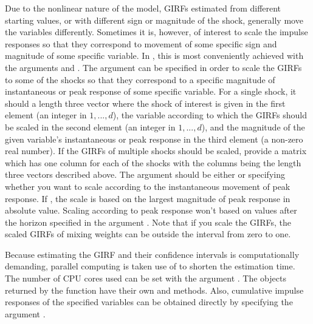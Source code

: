 \documentclass[nojss]{jss} %
\begin{document}
Due to the nonlinear nature of the model, GIRFs estimated from different starting values, or with different sign or magnitude of the shock, generally move the variables differently. Sometimes it is, however, of interest to scale the impulse responses so that they correspond to movement of some specific sign and magnitude of some specific variable. In , this is most conveniently achieved with the arguments  and . The argument  can be specified in order to scale the GIRFs to some of the shocks so that they correspond to a specific magnitude of instantaneous or peak response of some specific variable. For a single shock, it should a length three vector where the shock of interest is given in the first element (an integer in $1,...,d$), the variable according to which the GIRFs should be scaled in the second element (an integer in $1,...,d$), and the magnitude of the given variable's instantaneous or peak response in the third element (a non-zero real number). If the GIRFs of multiple shocks should be scaled, provide a matrix which has one column for each of the shocks with the columns being the length three vectors described above. The argument  should be either  or  specifying whether you want to scale according to the instantaneous movement of peak response. If , the scale is based on the largest magnitude of peak response in absolute value. Scaling according to peak response won't based on values after the horizon specified in the argument . Note that if you scale the GIRFs, the scaled GIRFs of mixing weights can be outside the interval from zero to one.

Because estimating the GIRF and their confidence intervals is computationally demanding, parallel computing is taken use of to shorten the estimation time. The number of CPU cores used can be set with the argument . The objects returned by the  function have their own  and  methods. Also, cumulative impulse responses of the specified variables can be obtained directly by specifying the argument .
\end{document}
